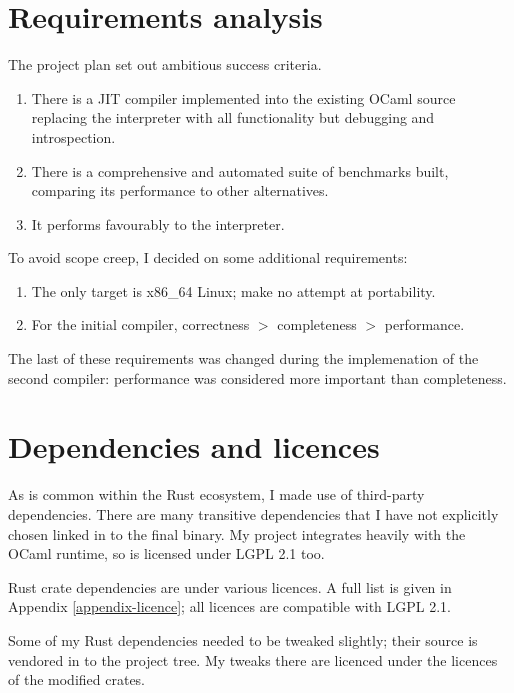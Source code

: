\section{Requirements analysis}

The project plan set out ambitious success criteria.

\begin{enumerate}
    \item There is a JIT compiler implemented into the existing OCaml source
          replacing the interpreter with all functionality but debugging
          and introspection.
    \item There is a comprehensive and automated suite of benchmarks built,
          comparing its performance to other alternatives.
    \item It performs favourably to the interpreter.
\end{enumerate}

To avoid scope creep, I decided on some additional requirements:

\begin{enumerate}
    \item The only target is x86\_64 Linux; make no attempt at portability.
    \item For the initial compiler, correctness $>$ completeness $>$ performance.
\end{enumerate}

The last of these requirements was changed during the implemenation of the second compiler:
performance was considered more important than completeness.

\section{Dependencies and licences}

As is common within the Rust ecosystem, I made use of third-party dependencies. There are many
transitive dependencies that I have not explicitly chosen linked in to the final binary. My project
integrates heavily with the OCaml runtime, so is licensed under LGPL 2.1 too.

Rust crate dependencies are under various licences. A full list is given in Appendix
\ref{appendix-licence}; all licences are compatible with LGPL 2.1.

Some of my Rust dependencies needed to be tweaked slightly; their source is
vendored in to the project tree. My tweaks there are licenced under the licences of the modified
crates.

